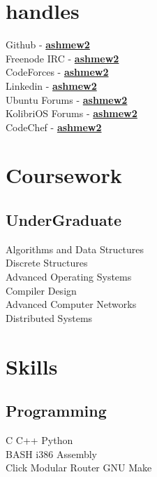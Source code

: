 \documentclass[letterpaper]{deedy-resume} %
\begin{document}
\begin{minipage}[t]{0.33\textwidth}
\section{handles}
Github - \href{https://github.com/ashmew2}{\bf ashmew2} \\
Freenode IRC - \href{http://freenode.org} {\bf ashmew2} \\
CodeForces - \href{http://codeforces.com/profile/ashmew2}{\bf ashmew2} \\
Linkedin - \href{in.linkedin.com/in/ashmew2/} {\bf ashmew2} \\
Ubuntu Forums - \href{http://ubuntuforums.org/showthread.php?t=821461} {\bf ashmew2} \\
KolibriOS Forums - \href{http://board.kolibrios.org/memberlist.php?mode=viewprofile&u=6211} {\bf ashmew2} \\
CodeChef - \href{http://www.codechef.com/users/ashmew2}{\bf ashmew2} \\
\sectionspace %
\section{Coursework}
\subsection{UnderGraduate}
Algorithms and Data Structures \\
Discrete Structures \\
Advanced Operating Systems \\
Compiler Design \\
Advanced Computer Networks \\
Distributed Systems \\
\sectionspace %
\section{Skills}
\subsection{Programming}
C \textbullet{} C++ \textbullet{} Python \\
BASH \textbullet{} i386 Assembly \\
Click Modular Router  \textbullet{} GNU Make \\
\sectionspace %

\end{minipage}
\end{document}
